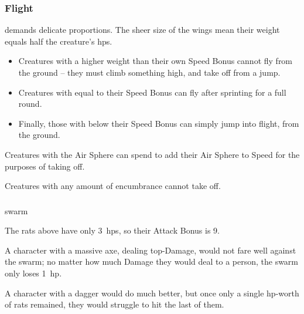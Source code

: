 \begin{multicols}{2}
\subsubsection{Flight}
demands delicate proportions.
The sheer size of the wings mean their \gls{weight} equals half the creature's \glspl{hp}.


\begin{itemize}
  \item
  Creatures with a higher \gls{weight} than their own Speed Bonus cannot fly from the ground -- they must climb something high, and take off from a jump.
  \item
  Creatures with  equal to their Speed Bonus can fly after sprinting for a full round.
  \item
  Finally, those with  below their Speed Bonus can simply jump into flight, from the ground.
\end{itemize}

Creatures with the Air Sphere can spend  to add their Air Sphere to Speed for the purposes of taking off.

Creatures with any amount of encumbrance cannot take off.


\subsubsection{}
\glsdesc{swarm}


\begin{exampletext}
  The rats above have only 3~\glspl{hp}, so their Attack Bonus is 9.

  A character with a massive axe, dealing top-Damage, would not fare well against the swarm; no matter how much Damage they would deal to a person, the swarm only loses 1~\gls{hp}.

  A character with a dagger would do much better, but once only a single \gls{hp}-worth of rats remained, they would struggle to hit the last of them.
\end{exampletext}

\end{multicols}
